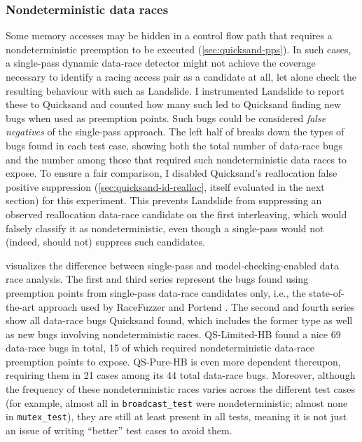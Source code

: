 \subsubsection{Nondeterministic data races}

Some memory accesses may be hidden in a control flow path that requires a nondeterministic preemption to be executed
(\cref{sec:quicksand-pps}).
In such cases, a single-pass dynamic data-race detector
might not achieve the coverage necessary
to identify a racing access pair as a candidate at all,
let alone check the resulting behaviour with such as Landslide.
I instrumented Landslide to report these to Quicksand
and counted how many such led to Quicksand finding new bugs when used as preemption points.
Such bugs could be considered {\em false negatives} of the single-pass approach.
The left half of 
breaks down the types of bugs
found in each test case,
showing both the total number of data-race bugs
and the number among those that required such nondeterministic data races to expose.
%
To ensure a fair comparison, I disabled Quicksand's reallocation false positive suppression
(\cref{sec:quicksand-id-realloc}, itself evaluated in the next section)
for this experiment.
This prevents Landslide from suppressing an observed reallocation data-race candidate on the first interleaving,
which would falsely classify it as nondeterministic,
even though a single-pass would not (indeed, should not) suppress such candidates.

visualizes the difference between single-pass and model-checking-enabled data race analysis.
The first and third series represent the bugs found using preemption points from single-pass data-race candidates only,
i.e., the state-of-the-art approach used by RaceFuzzer \cite{racefuzzer} and Portend \cite{portend}.
The second and fourth series show all data-race bugs Quicksand found,
which includes the former type as well as new bugs involving nondeterministic races.
QS-Limited-HB found a nice 69 data-race bugs in total, %
15 of which %
required nondeterministic data-race preemption points to expose.
QS-Pure-HB is even more dependent thereupon, %
requiring them in 21 cases among its 44 total data-race bugs.
Moreover, although the frequency
of these nondeterministic races varies across the different test cases
(for example, almost all in {\tt broadcast\_test} were nondeterministic; almost none in {\tt mutex\_test}),
they are still at least present in all tests,
meaning it is not just an issue of writing ``better'' test cases to avoid them.

